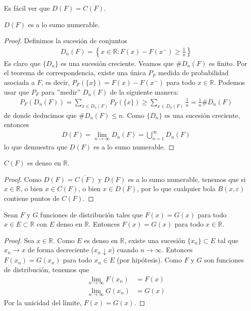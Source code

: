 \begin{obs}
    Es fácil ver que $D(F) = \overline{C(F)}$.
\end{obs}

\begin{prop}
    $D(F)$ es a lo sumo numerable.
\end{prop}

\begin{proof}
    Definimos la sucesión de conjuntos
    \begin{align*}
        D_n(F) = \left\{ x \in \mathbb{R} : F(x) - F(x^-) \ge \frac{1}{n} \right\}
    \end{align*}
    Es claro que $\{D_n\}$ es una sucesión creciente. Veamos que $\#D_n(F)$ es finito. Por el teorema de correspondencia, existe una única $P_F$ medida de probabilidad asociada a $F$, es decir, $P_F(\{x\}) = F(x) - F(x^-)$ para todo $x \in \mathbb{R}$. Podemos usar que $P_F$ para ''medir'' $D_n(F)$ de la siguiente manera:
    \begin{align*}
        P_F(D_n(F)) = \sum_{x \in D_n(F)} P_F(\{x\}) \ge \sum_{x \in D_n(F)} \frac{1}{n} = \frac{1}{n} \#D_n(F)
    \end{align*}
    de donde deducimos que $\#D_n(F) \leq n$. Como $\{D_n\}$ es una sucesión creciente, entonces
    \begin{align*}
        D(F) = \lim_{n \to \infty} D_n(F) = \bigcup_{n=1}^{\infty} D_n(F)
    \end{align*}
    lo que demuestra que $D(F)$ es a lo sumo numerable.
\end{proof}

\begin{cor}
    $C(F)$ es denso en $\mathbb{R}$.
\end{cor}

\begin{proof}
    Como $D(F) = \overline{C(F)}$ y $D(F)$ es a lo sumo numerable, tenemos que si $x \in \mathbb{R}$, o bien $x \in C(F)$, o bien $x \in D(F)$, por lo que cualquier bola $B(x,\varepsilon)$ contiene puntos de $C(F)$.
\end{proof}

\begin{prop}
    Sean $F$ y $G$ funciones de distribución tales que $F(x) = G(x)$ para todo $x \in E \subset \mathbb{R}$ con $E$ denso en $\mathbb{R}$. Entonces $F(x) = G(x)$ para todo $x \in \mathbb{R}$.
\end{prop}

\begin{proof}
    Sea $x \in \mathbb{R}$. Como $E$ es denso en $\mathbb{R}$, existe una sucesión $\{x_n\} \subset E$ tal que $x_n \to x$ de forma decreciente ($x_n \downarrow x$) cuando $n \to \infty$. Entonces $F(x_n) = G(x_n)$ para todo $x_n \in E$ (por hipótesis). Como $F$ y $G$ son funciones de distribución, tenemos que
    \begin{align*}
        \lim_{n \to \infty} F(x_n) & = F(x) \\
        \lim_{n \to \infty} G(x_n) & = G(x)
    \end{align*}
    Por la unicidad del límite, $F(x) = G(x)$.
\end{proof}


